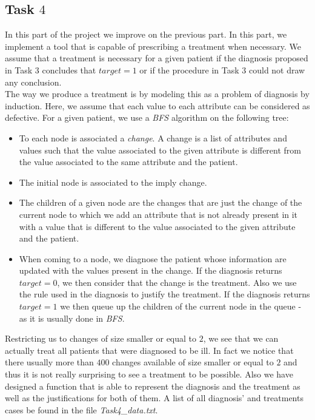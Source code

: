 \documentclass[french]{article}
\begin{document}
\subsection{Task $4$}
	In this part of the project we improve on the previous part. In this part, we implement a tool that is capable of prescribing a treatment when necessary. We assume that a treatment is necessary for a given patient if the diagnosis proposed in Task $3$ concludes that $target=1$ or if the procedure in Task $3$ could not draw any conclusion.\\
	The way we produce a treatment is by modeling this as a problem of diagnosis by induction. Here, we assume that each value to each attribute can be considered as defective. For a given patient, we use a \emph{BFS} algorithm on the following tree:
	\begin{itemize}
		\item To each node is associated a \emph{change}. A change is a list of attributes and values such that the value associated to the given attribute is different from the value associated to the same attribute and the patient.
		\item The initial node is associated to the imply change.
		\item The children of a given node are the changes that are just the change of the current node to which we add an attribute that is not already present in it with a value that is different to the value associated to the given attribute and the patient.
		\item When coming to a node, we diagnose the patient whose information are updated with the values present in the change. If the diagnosis returns $target=0$, we then consider that the change is the treatment. Also we use the rule used in the diagnosis to justify the treatment. If the diagnosis returns $target=1$ we then queue up the children of the current node in the queue - as it is usually done in \emph{BFS}.
	\end{itemize}
Restricting us to changes of size smaller or equal to $2$, we see that we can actually treat all patients that were diagnosed to be ill. In fact we notice that there usually more than $400$ changes available of size smaller or equal to $2$ and thus it is not really surprising to see a treatment to be possible. Also we have designed a function that is able to represent the diagnosis and the treatment as well as the justifications for both of them. A list of all diagnosis' and treatments cases be found in the file \emph{Task4\_data.txt}.
\end{document}

